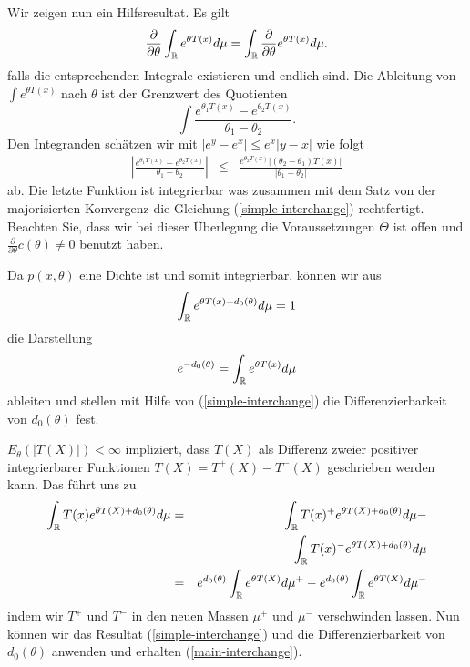 Wir zeigen nun ein Hilfsresultat. Es gilt
\begin{equation}
	\frac{\partial}{\partial \theta} \int_{\mathbb R}^{} e^{\theta T(x)} d\mu 
	= \int_{\mathbb R} \frac{\partial}{\partial \theta} e^{\theta T(x)} d\mu.
	\label{simple-interchange}
\end{equation}
falls die entsprechenden Integrale existieren und endlich sind.
Die Ableitung von $\int e^{\theta T(x)}$ nach $\theta$ ist der Grenzwert des Quotienten
\begin{equation}
	\int \frac{e^{\theta_1 T(x)} - e^{\theta_2 T(x)}}{\theta_1 - \theta_2}.
\end{equation}
Den Integranden schätzen wir mit $|e^y - e^x|\leq e^x |y-x|$ wie folgt
\begin{eqnarray}
	\left| \frac{e^{\theta_1 T(x)} - e^{\theta_2 T(x)}}{\theta_1 - \theta_2} \right| &\leq& 
	\frac{e^{\theta_2 T(x)} | (\theta_2 -\theta_1) T(x) | }{ |\theta_1 - \theta_2| }
\end{eqnarray}
ab. Die letzte Funktion ist integrierbar was zusammen mit dem Satz von der majorisierten Konvergenz
die Gleichung (\ref{simple-interchange}) rechtfertigt. Beachten Sie, dass wir bei dieser Überlegung
die Voraussetzungen $\Theta$ ist offen und $\frac{\partial}{\partial \theta}c(\theta)\neq 0$
benutzt haben.

Da $p(x,\theta)$ eine Dichte ist und somit integrierbar, können wir aus
\begin{equation}
	\int_{\mathbb R}^{} e^{\theta T(x) + d_0(\theta)}d \mu = 1
\end{equation}
die Darstellung
\begin{equation}
	e^{-d_0(\theta)} = \int_{\mathbb R}^{} e^{\theta T(x)} d \mu
\end{equation}
ableiten und stellen mit Hilfe von (\ref{simple-interchange}) die Differenzierbarkeit von $d_0(\theta)$ fest.


$E_\theta \left( | T(X) | \right) < \infty$ impliziert, dass $T(X)$ als Differenz zweier
positiver integrierbarer Funktionen $T(X) = T^+(X) - T^-(X)$ geschrieben werden kann.
Das führt uns zu
\begin{eqnarray}
	\int_{\mathbb R}^{} T(x) e^{ \theta T(X) + d_0(\theta) } d\mu &=& 
	\int_{\mathbb R}^{} T(x)^+ e^{ \theta T(X) + d_0(\theta) } d\mu - \\
	&& \int_{\mathbb R}^{} T(x)^- e^{ \theta T(X) + d_0(\theta) } d\mu  \\
	&=&  e^{d_0(\theta)} \int_{\mathbb R}^{} e^{ \theta T(X) } d\mu^+ - e^{d_0(\theta)} \int_{\mathbb R}^{} e^{ \theta T(X) } d\mu^-
\end{eqnarray} 
indem wir $T^+$ und $T^-$ in den neuen Massen $\mu^+$ und $\mu^-$ verschwinden lassen.
Nun können wir das Resultat (\ref{simple-interchange}) und die Differenzierbarkeit von $d_0(\theta)$
anwenden und erhalten (\ref{main-interchange}).


